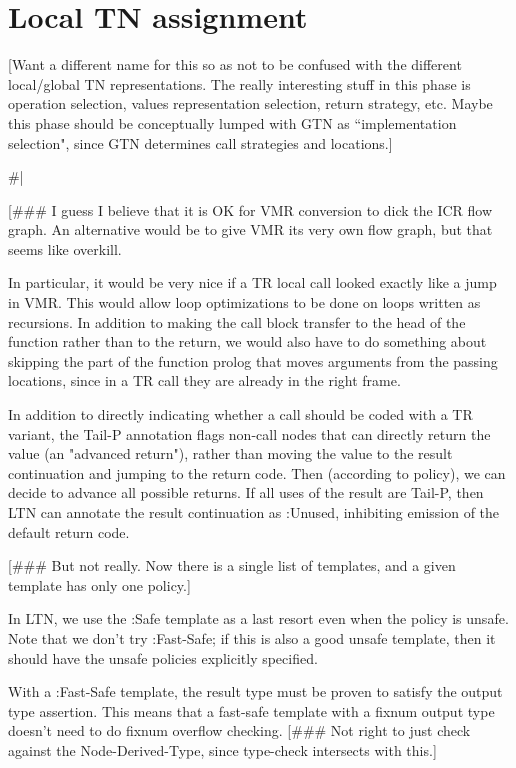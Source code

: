 
\chapter{Local TN assignment}

[Want a different name for this so as not to be confused with the different
local/global TN representations.  The really interesting stuff in this phase is
operation selection, values representation selection, return strategy, etc.
Maybe this phase should be conceptually lumped with GTN as ``implementation
selection", since GTN determines call strategies and locations.]

\#|

[\#\#\# I guess I believe that it is OK for VMR conversion to dick the ICR flow
graph.  An alternative would be to give VMR its very own flow graph, but that
seems like overkill.

In particular, it would be very nice if a TR local call looked exactly like a
jump in VMR.  This would allow loop optimizations to be done on loops written
as recursions.  In addition to making the call block transfer to the head of
the function rather than to the return, we would also have to do something
about skipping the part of the function prolog that moves arguments from the
passing locations, since in a TR call they are already in the right frame.


In addition to directly indicating whether a call should be coded with a TR
variant, the Tail-P annotation flags non-call nodes that can directly return
the value (an "advanced return"), rather than moving the value to the result
continuation and jumping to the return code.  Then (according to policy), we
can decide to advance all possible returns.  If all uses of the result are
Tail-P, then LTN can annotate the result continuation as :Unused, inhibiting
emission of the default return code.

[\#\#\# But not really.  Now there is a single list of templates, and a given
template has only one policy.]

In LTN, we use the :Safe template as a last resort even when the policy is
unsafe.  Note that we don't try :Fast-Safe; if this is also a good unsafe
template, then it should have the unsafe policies explicitly specified.

With a :Fast-Safe template, the result type must be proven to satisfy the
output type assertion.  This means that a fast-safe template with a fixnum
output type doesn't need to do fixnum overflow checking.  [\#\#\# Not right to
just check against the Node-Derived-Type, since type-check intersects with
this.]


